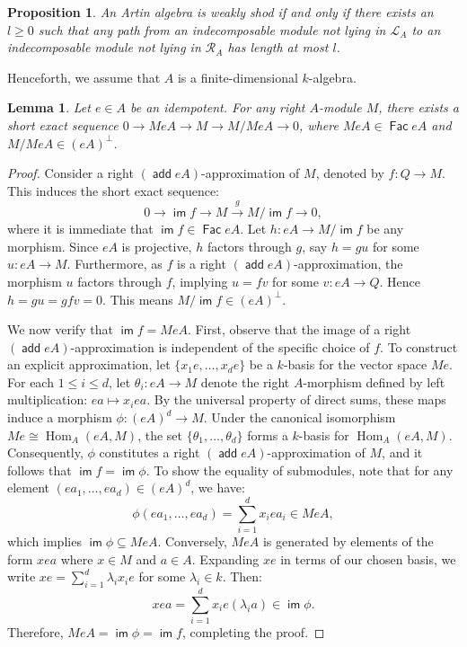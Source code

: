 \documentclass[12pt,a4paper,reqno]{amsart}
\newtheorem{lemma}[theorem]{Lemma}
\newtheorem{proposition}[theorem]{Proposition}
\theoremstyle{definition}
\newcommand{\opname}[1]{\operatorname{\mathsf{#1}}}
\newcommand{\add}{\opname{add}\nolimits}
\newcommand{\Fac}{\opname{Fac}}
\newcommand{\im}{\opname{im}\nolimits}
\begin{document}

\begin{proposition}\cite[Proposition 1.3]{AC04} \label{p:weakly shod}
An Artin algebra is weakly shod if and only if there exists an $l \geq 0$ such that any path from an indecomposable module not lying in $\mathcal{L}_A$ to an indecomposable module not lying in $\mathcal{R}_A$ has length at most $l$.
\end{proposition}


Henceforth, we assume that $A$ is a finite-dimensional $k$-algebra.

\begin{lemma}\label{l:canonical-sequence}
Let $e\in A$ be an idempotent. For any right $A$-module $M$, there exists a short exact sequence $0\to MeA\to M \to M/MeA\to 0$, where $MeA \in \Fac eA$ and $M/MeA \in (eA)^\perp$.
\end{lemma}
\begin{proof}
Consider a right $(\add eA)$-approximation of $M$, denoted by $f: Q\to M$. This induces the short exact sequence:
\[0\to \im f \to M\xrightarrow{g} M/\im f\to 0,\] where it is immediate that $\im f \in \Fac eA$. Let $h: eA \to M/\im f$ be any morphism. Since $eA$ is projective, $h$ factors through $g$, say $h = gu$ for some $u: eA \to M$. Furthermore, as $f$ is a right $(\add eA)$-approximation, the morphism $u$ factors through $f$, 
implying $u = fv$ for some $v: eA \to Q$. Hence $h = gu = gfv = 0$. This means $M/\im f \in (eA)^\perp$.


We now verify that $\im f = MeA$. First, observe that the image of a right $(\add eA)$-approximation is independent of the specific choice of $f$. To construct an explicit approximation, let $\{x_1e, \dots, x_de\}$ be a $k$-basis for the vector space $Me$. For each $1 \leq i \leq d$, let $\theta_i: eA \to M$ denote the right $A$-morphism defined by left multiplication: $ea \mapsto x_iea$. By the universal property of direct sums, these maps induce a morphism $\phi: (eA)^d \to M$. Under the canonical isomorphism $Me \cong \operatorname{Hom}_A(eA, M)$, the set $\{\theta_1, \dots, \theta_d\}$ forms a $k$-basis for $\operatorname{Hom}_A(eA, M)$. Consequently, $\phi$ constitutes a right $(\add eA)$-approximation of $M$, and it follows that $\im f = \im \phi$. To show the equality of submodules, note that for any element $(ea_1, \dots, ea_d) \in (eA)^d$, we have:$$ \phi(ea_1, \dots, ea_d) = \sum_{i=1}^d x_iea_i \in MeA, $$ which implies $\im \phi \subseteq MeA$. Conversely, $MeA$ is generated by elements of the form $xea$ where $x \in M$ and $a \in A$. Expanding $xe$ in terms of our chosen basis, we write $xe = \sum_{i=1}^d \lambda_i x_i e$ for some $\lambda_i \in k$. Then:$$ xea = \sum_{i=1}^d x_ie(\lambda_i a) \in \im \phi. $$Therefore, $MeA = \im \phi = \im f$, completing the proof.
\end{proof} 
\end{document}

